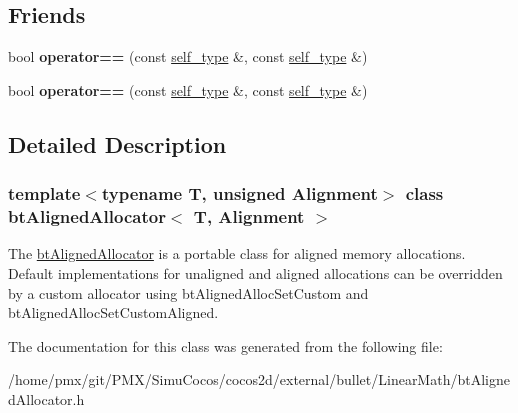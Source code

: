 \subsection*{Friends}
\begin{DoxyCompactItemize}
\item 
\mbox{\label{classbtAlignedAllocator_a925f6a7a595252ceb9a7c4be506f983c}} 
bool {\bfseries operator==} (const \hyperlink{classbtAlignedAllocator}{self\+\_\+type} \&, const \hyperlink{classbtAlignedAllocator}{self\+\_\+type} \&)
\item 
\mbox{\label{classbtAlignedAllocator_a925f6a7a595252ceb9a7c4be506f983c}} 
bool {\bfseries operator==} (const \hyperlink{classbtAlignedAllocator}{self\+\_\+type} \&, const \hyperlink{classbtAlignedAllocator}{self\+\_\+type} \&)
\end{DoxyCompactItemize}


\subsection{Detailed Description}
\subsubsection*{template$<$typename T, unsigned Alignment$>$\newline
class bt\+Aligned\+Allocator$<$ T, Alignment $>$}

The \hyperlink{classbtAlignedAllocator}{bt\+Aligned\+Allocator} is a portable class for aligned memory allocations. Default implementations for unaligned and aligned allocations can be overridden by a custom allocator using bt\+Aligned\+Alloc\+Set\+Custom and bt\+Aligned\+Alloc\+Set\+Custom\+Aligned. 

The documentation for this class was generated from the following file\+:\begin{DoxyCompactItemize}
\item 
/home/pmx/git/\+P\+M\+X/\+Simu\+Cocos/cocos2d/external/bullet/\+Linear\+Math/bt\+Aligned\+Allocator.\+h\end{DoxyCompactItemize}
